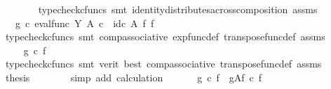 \begin{isabellebody}
\ \ \ \ \ \ \isamarkupfalse%
\ {\isacharparenleft}{\kern0pt}typecheck{\isacharunderscore}{\kern0pt}cfuncs{\isacharcomma}{\kern0pt}\ smt\ identity{\isacharunderscore}{\kern0pt}distributes{\isacharunderscore}{\kern0pt}across{\isacharunderscore}{\kern0pt}composition\ assms{\isacharparenright}{\kern0pt}\isanewline
\ \ \ \ \isamarkupfalse%
\ \isamarkupfalse%
\ {\isachardoublequoteopen}{\isachardot}{\kern0pt}{\isachardot}{\kern0pt}{\isachardot}{\kern0pt}\ {\isacharequal}{\kern0pt}\ {\isacharparenleft}{\kern0pt}g\ {\isasymcirc}\isactrlsub c\ eval{\isacharunderscore}{\kern0pt}func\ Y\ A{\isacharparenright}{\kern0pt}\ {\isasymcirc}\isactrlsub c\ \ {\isacharparenleft}{\kern0pt}id\isactrlsub c\ A\ {\isasymtimes}\isactrlsub f\ f\isactrlsup {\isasymsharp}{\isacharparenright}{\kern0pt}{\isachardoublequoteclose}\isanewline
\ \ \ \ \ \ \isamarkupfalse%
\ {\isacharparenleft}{\kern0pt}typecheck{\isacharunderscore}{\kern0pt}cfuncs{\isacharcomma}{\kern0pt}\ smt\ comp{\isacharunderscore}{\kern0pt}associative{}\ exp{\isacharunderscore}{\kern0pt}func{\isacharunderscore}{\kern0pt}def{}\ transpose{\isacharunderscore}{\kern0pt}func{\isacharunderscore}{\kern0pt}def\ assms{\isacharparenright}{\kern0pt}\isanewline
\ \ \ \ \isamarkupfalse%
\ \isamarkupfalse%
\ {\isachardoublequoteopen}{\isachardot}{\kern0pt}{\isachardot}{\kern0pt}{\isachardot}{\kern0pt}\ {\isacharequal}{\kern0pt}\ g\ {\isasymcirc}\isactrlsub c\ f{\isachardoublequoteclose}\isanewline
\ \ \ \ \ \ \isamarkupfalse%
\ {\isacharparenleft}{\kern0pt}typecheck{\isacharunderscore}{\kern0pt}cfuncs{\isacharcomma}{\kern0pt}\ smt\ {\isacharparenleft}{\kern0pt}verit{\isacharcomma}{\kern0pt}\ best{\isacharparenright}{\kern0pt}\ comp{\isacharunderscore}{\kern0pt}associative{}\ transpose{\isacharunderscore}{\kern0pt}func{\isacharunderscore}{\kern0pt}def\ assms{\isacharparenright}{\kern0pt}\isanewline
\ \ \ \ \isamarkupfalse%
\ \isamarkupfalse%
\ {\isacharquery}{\kern0pt}thesis\isanewline
\ \ \ \ \ \ \isamarkupfalse%
\ {\isacharparenleft}{\kern0pt}simp\ add{\isacharcolon}{\kern0pt}\ calculation{\isacharparenright}{\kern0pt}\isanewline
\ \ \isamarkupfalse%
\isanewline
\ \ \isamarkupfalse%
\ {\isachardoublequoteopen}{\isacharparenleft}{\kern0pt}g\ {\isasymcirc}\isactrlsub c\ f{\isacharparenright}{\kern0pt}\isactrlsup {\isasymsharp}\ {\isacharequal}{\kern0pt}\ g\isactrlbsup A\isactrlesup \isactrlsub f\ {\isasymcirc}\isactrlsub c\ f\isactrlsup {\isasymsharp}{\isachardoublequoteclose}\isanewline

\end{isabellebody}
